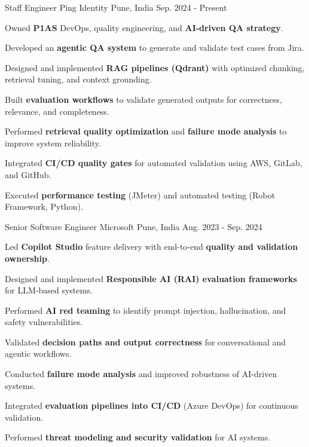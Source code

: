 

\begin{cventries}

\cventry
  {Staff Engineer}
  {Ping Identity}
  {Pune, India}
  {Sep. 2024 - Present}
  {
    \begin{cvitems}
      \item {Owned \textbf{P1AS} DevOps, quality engineering, and \textbf{AI-driven QA strategy}.}
      \item {Developed an \textbf{agentic QA system} to generate and validate test cases from Jira.}
      \item {Designed and implemented \textbf{RAG pipelines (Qdrant)} with optimized chunking, retrieval tuning, and context grounding.}
      \item {Built \textbf{evaluation workflows} to validate generated outputs for correctness, relevance, and completeness.}
      \item {Performed \textbf{retrieval quality optimization} and \textbf{failure mode analysis} to improve system reliability.}
      \item {Integrated \textbf{CI/CD quality gates} for automated validation using AWS, GitLab, and GitHub.}
      \item {Executed \textbf{performance testing} (JMeter) and automated testing (Robot Framework, Python).}

    \end{cvitems}
  }

\cventry
  {Senior Software Engineer}
  {Microsoft}
  {Pune, India}
  {Aug. 2023 - Sep. 2024}
  {
    \begin{cvitems}
      \item {Led \textbf{Copilot Studio} feature delivery with end-to-end \textbf{quality and validation ownership}.}
      \item {Designed and implemented \textbf{Responsible AI (RAI) evaluation frameworks} for LLM-based systems.}
      \item {Performed \textbf{AI red teaming} to identify prompt injection, hallucination, and safety vulnerabilities.}
      \item {Validated \textbf{decision paths and output correctness} for conversational and agentic workflows.}
      \item {Conducted \textbf{failure mode analysis} and improved robustness of AI-driven systems.}
      \item {Integrated \textbf{evaluation pipelines into CI/CD} (Azure DevOps) for continuous validation.}
      \item {Performed \textbf{threat modeling and security validation} for AI systems.}
    \end{cvitems}
  }


\end{cventries}
